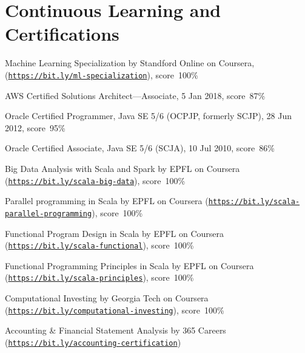 \documentclass[letterpaper]{article}
\newenvironment{no-indent-itemize}{
  \begin{list}{}{
    \setlength{\leftmargin}{0em}
  }
}{
  \end{list}
}
\begin{document}
\section*{Continuous Learning and Certifications}
\begin{no-indent-itemize}
  \item Machine Learning Specialization by Standford Online on Coursera, (\href{https://bit.ly/ml-specialization}{\tt https://bit.ly/ml-specialization}), score~100\%
  \item AWS Certified Solutions Architect---Associate, 5 Jan 2018, score~87\%
  \item Oracle Certified Programmer, Java SE 5/6 (OCPJP, formerly SCJP), 28 Jun 2012, score~95\%
  \item Oracle Certified Associate, Java SE 5/6 (SCJA), 10 Jul 2010, score~86\%
  \item Big Data Analysis with Scala and Spark by EPFL on Coursera 
        (\href{https://bit.ly/scala-big-data}{\tt https://bit.ly/scala-big-data}), score~100\%
  \item Parallel programming in Scala by EPFL on Coursera 
        (\href{https://bit.ly/scala-parallel-programming}{\tt https://bit.ly/scala-parallel-programming}), score~100\%
  \item Functional Program Design in Scala by EPFL on Coursera 
        (\href{https://bit.ly/scala-functional}{\tt https://bit.ly/scala-functional}), score~100\%
  \item Functional Programming Principles in Scala by EPFL on Coursera 
        (\href{https://bit.ly/scala-principles}{\tt https://bit.ly/scala-principles}), score~100\%
  \item Computational Investing by Georgia Tech on Coursera 
        (\href{https://bit.ly/computational-investing}{\tt https://bit.ly/computational-investing}), score~100\%
  \item Accounting \& Financial Statement Analysis by 365 Careers
        (\href{https://bit.ly/accounting-certification}{\tt https://bit.ly/accounting-certification})
\end{no-indent-itemize}
\end{document}
